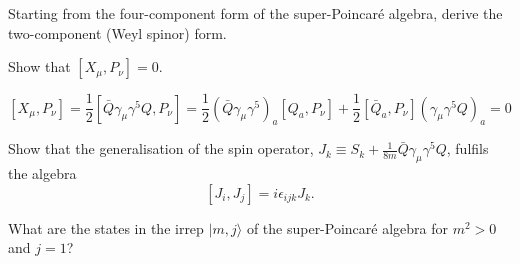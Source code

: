 \documentclass[notes.tex]{subfiles}
\begin{document}
\begin{Exercise}[]
Starting from the four-component form of the super-Poincaré algebra, derive the two-component (Weyl spinor) form.
\end{Exercise}


\begin{Exercise}[]
Show that $[X_\mu,P_\nu]=0$.
\end{Exercise}

\begin{Answer} 
\[
[X_\mu,P_\nu]=\frac{1}{2}[\bar Q\gamma_\mu\gamma^5Q,P_\nu]=\frac{1}{2}(\bar Q\gamma_\mu\gamma^5)_a[Q_a,P_\nu]+\frac{1}{2}[\bar Q_a,P_\nu](\gamma_\mu\gamma^5Q)_a=0
\]
\end{Answer}

\begin{Exercise}[]
Show that the generalisation of the spin operator, $J_k\equiv S_k + \frac{1}{8m}\bar{Q}\gamma_\mu \gamma^5 Q$, fulfils the algebra
\[[J_i, J_j] = i\epsilon_{ijk}J_k.\]
\end{Exercise}

\begin{Exercise}[]
What are the states in the irrep $|m,j\rangle$ of the super-Poincaré algebra for $m^2>0$ and $j=1$?
\end{Exercise}
\end{document}
